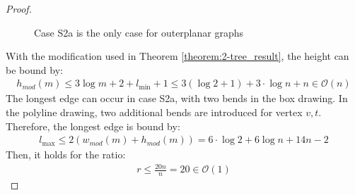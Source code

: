 \begin{proof}
\begin{figure}[H]
\begin{subfigure}{0.8\linewidth}
		\end{subfigure}
		\caption{Case S2a is the only case for outerplanar graphs}\label{im:outerplanar}
	\end{figure}
	With the modification used in Theorem \ref{theorem:2-tree_result}, the height can be bound by:
	\begin{align}
		h_{mod}(m)\leq 3\log m + 2 + l_{\min} + 1\leq 3(\log 2 +1)+3\cdot \log n + n \in \mathcal{O}(n)
	\end{align}
	The longest edge can occur in case S2a, with two bends in the box drawing. In the polyline drawing, two additional bends are introduced for vertex $v,t$. Therefore, the longest edge is bound by:
	\begin{align}
		l_{\max}\leq 2(w_{mod}(m)+h_{mod}(m))= 6\cdot \log 2 +6\log n + 14n - 2
	\end{align}
	Then, it holds for the ratio:
	\begin{align}r \leq \frac{20n}{n} = 20 \in \mathcal{O}(1)
	\end{align}
\end{proof}